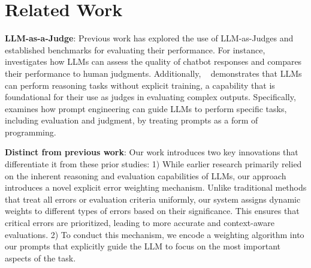 



\section{Related Work}\label{sec:background}

\noindent\textbf{LLM-as-a-Judge}: Previous work has explored the use of LLM-as-Judges and established benchmarks for evaluating their performance. For instance, ~\cite{zheng2023judging} investigates how LLMs can assess the quality of chatbot responses and compares their performance to human judgments. Additionally, ~\cite{kojima2022large} demonstrates that LLMs can perform reasoning tasks without explicit training, a capability that is foundational for their use as judges in evaluating complex outputs. Specifically, ~\cite{beurer2023prompting} examines how prompt engineering can guide LLMs to perform specific tasks, including evaluation and judgment, by treating prompts as a form of programming.


\noindent\textbf{Distinct from previous work}: Our work introduces two key innovations that differentiate it from these prior studies: 1) While earlier research primarily relied on the inherent reasoning and evaluation capabilities of LLMs, our approach introduces a novel explicit error weighting mechanism. Unlike traditional methods that treat all errors or evaluation criteria uniformly, our system assigns dynamic weights to different types of errors based on their significance. This ensures that critical errors are prioritized, leading to more accurate and context-aware evaluations. 2) To conduct this mechanism, we encode a weighting algorithm into our prompts that explicitly guide the LLM to focus on the most important aspects of the task. 





